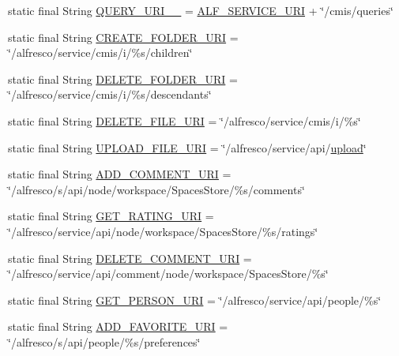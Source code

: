\begin{DoxyCompactItemize}
\item 
static final String \hyperlink{classcom_1_1zia_1_1freshdocs_1_1cmis_1_1_c_m_i_s_aa443ae95ad39f06395535504ba5a85ed}{Q\-U\-E\-R\-Y\-\_\-\-U\-R\-I\-\_\-\_} = \hyperlink{classcom_1_1zia_1_1freshdocs_1_1cmis_1_1_c_m_i_s_a3ed64fb0006fa1ccc6c135041ab95db5}{A\-L\-F\-\_\-\-S\-E\-R\-V\-I\-C\-E\-\_\-\-U\-R\-I} + \char`\"{}/cmis/queries\char`\"{}
\item 
static final String \hyperlink{classcom_1_1zia_1_1freshdocs_1_1cmis_1_1_c_m_i_s_ac5c5f1b8ccb32224a3d73f8316ddb968}{C\-R\-E\-A\-T\-E\-\_\-\-F\-O\-L\-D\-E\-R\-\_\-\-U\-R\-I} = \char`\"{}/alfresco/service/cmis/i/\%s/children\char`\"{}
\item 
static final String \hyperlink{classcom_1_1zia_1_1freshdocs_1_1cmis_1_1_c_m_i_s_abe3d62e06b618877f0a1e8138140384a}{D\-E\-L\-E\-T\-E\-\_\-\-F\-O\-L\-D\-E\-R\-\_\-\-U\-R\-I} = \char`\"{}/alfresco/service/cmis/i/\%s/descendants\char`\"{}
\item 
static final String \hyperlink{classcom_1_1zia_1_1freshdocs_1_1cmis_1_1_c_m_i_s_aee10ba322d98a819789ab6999555f767}{D\-E\-L\-E\-T\-E\-\_\-\-F\-I\-L\-E\-\_\-\-U\-R\-I} = \char`\"{}/alfresco/service/cmis/i/\%s\char`\"{}
\item 
static final String \hyperlink{classcom_1_1zia_1_1freshdocs_1_1cmis_1_1_c_m_i_s_a5c35a22041c7526f1e3aa2e77870a725}{U\-P\-L\-O\-A\-D\-\_\-\-F\-I\-L\-E\-\_\-\-U\-R\-I} = \char`\"{}/alfresco/service/api/\hyperlink{classcom_1_1zia_1_1freshdocs_1_1cmis_1_1_c_m_i_s_a1f81d462d8556e4359077ebe666a1b22}{upload}\char`\"{}
\item 
static final String \hyperlink{classcom_1_1zia_1_1freshdocs_1_1cmis_1_1_c_m_i_s_a92edc6de538750326878fc9c9071c0c7}{A\-D\-D\-\_\-\-C\-O\-M\-M\-E\-N\-T\-\_\-\-U\-R\-I} = \char`\"{}/alfresco/s/api/node/workspace/Spaces\-Store/\%s/comments\char`\"{}
\item 
static final String \hyperlink{classcom_1_1zia_1_1freshdocs_1_1cmis_1_1_c_m_i_s_a2e72a5dfa61597fe7d1a759ff08e36a0}{G\-E\-T\-\_\-\-R\-A\-T\-I\-N\-G\-\_\-\-U\-R\-I} = \char`\"{}/alfresco/service/api/node/workspace/Spaces\-Store/\%s/ratings\char`\"{}
\item 
static final String \hyperlink{classcom_1_1zia_1_1freshdocs_1_1cmis_1_1_c_m_i_s_a1b40d60531c508d03e374153caa8f658}{D\-E\-L\-E\-T\-E\-\_\-\-C\-O\-M\-M\-E\-N\-T\-\_\-\-U\-R\-I} = \char`\"{}/alfresco/service/api/comment/node/workspace/Spaces\-Store/\%s\char`\"{}
\item 
static final String \hyperlink{classcom_1_1zia_1_1freshdocs_1_1cmis_1_1_c_m_i_s_aa517c2dfbd34bf56cf3dbc03f18ba77a}{G\-E\-T\-\_\-\-P\-E\-R\-S\-O\-N\-\_\-\-U\-R\-I} = \char`\"{}/alfresco/service/api/people/\%s\char`\"{}
\item 
static final String \hyperlink{classcom_1_1zia_1_1freshdocs_1_1cmis_1_1_c_m_i_s_a5635b4e2277ce6a48190f1195d1c2d85}{A\-D\-D\-\_\-\-F\-A\-V\-O\-R\-I\-T\-E\-\_\-\-U\-R\-I} = \char`\"{}/alfresco/s/api/people/\%s/preferences\char`\"{}
\end{DoxyCompactItemize}


